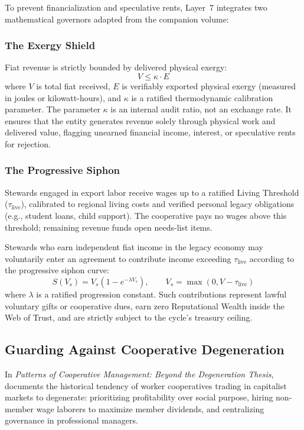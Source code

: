 To prevent financialization and speculative rents, Layer~7 integrates two mathematical governors adapted from the companion volume:

\subsubsection{The Exergy Shield}
Fiat revenue is strictly bounded by delivered physical exergy:
\begin{equation}
  V \le \kappa \cdot E
  \label{eq:exergy_shield}
\end{equation}
where $V$ is total fiat received, $E$ is verifiably exported physical exergy (measured in joules or kilowatt-hours), and $\kappa$ is a ratified thermodynamic calibration parameter. The parameter $\kappa$ is an internal audit ratio, not an exchange rate. It ensures that the entity generates revenue solely through physical work and delivered value, flagging unearned financial income, interest, or speculative rents for rejection.

\subsubsection{The Progressive Siphon}
Stewards engaged in export labor receive wages up to a ratified Living Threshold ($\tau_{\mathrm{live}}$), calibrated to regional living costs and verified personal legacy obligations (e.g., student loans, child support). The cooperative pays no wages above this threshold; remaining revenue funds open needs-list items.

Stewards who earn independent fiat income in the legacy economy may voluntarily enter an agreement to contribute income exceeding $\tau_{\mathrm{live}}$ according to the progressive siphon curve:
\begin{equation}
  S(V_s) = V_s \left( 1 - e^{-\lambda V_s} \right), \qquad V_s = \max(0, V - \tau_{\mathrm{live}})
  \label{eq:progressive_siphon}
\end{equation}
where $\lambda$ is a ratified progression constant. Such contributions represent lawful voluntary gifts or cooperative dues, earn zero Reputational Wealth inside the Web of Trust, and are strictly subject to the cycle's treasury ceiling.

\subsection{Guarding Against Cooperative Degeneration}

In \textit{Patterns of Cooperative Management: Beyond the Degeneration Thesis}, \textcite{cornforth1995} documents the historical tendency of worker cooperatives trading in capitalist markets to degenerate: prioritizing profitability over social purpose, hiring non-member wage laborers to maximize member dividends, and centralizing governance in professional managers.

